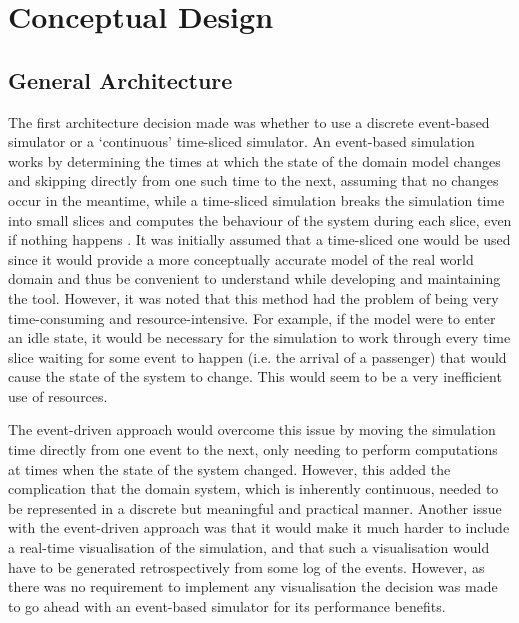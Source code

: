 \documentclass{UoYCSproject}
\begin{document}
\section{Conceptual Design}

\subsection{General Architecture}

The first architecture decision made was whether to use a discrete event-based simulator or a `continuous' time-sliced simulator.  An event-based simulation works by determining the times at which the state of the domain model changes and skipping directly from one such time to the next, assuming that no changes occur in the meantime, while a time-sliced simulation breaks the simulation time into small slices and computes the behaviour of the system during each slice, even if nothing happens \citep{Matloff2008}.  It was initially assumed that a time-sliced one would be used since it would provide a more conceptually accurate model of the real world domain and thus be convenient to understand while developing and maintaining the tool.  However, it was noted that this method had the problem of being very time-consuming and resource-intensive.  For example, if the model were to enter an idle state, it would be necessary for the simulation to work through every time slice waiting for some event to happen (i.e. the arrival of a passenger) that would cause the state of the system to change.  This would seem to be a very inefficient use of resources.

The event-driven approach would overcome this issue by moving the simulation time directly from one event to the next, only needing to perform computations at times when the state of the system changed.  However, this added the complication that the domain system, which is inherently continuous, needed to be represented in a discrete but meaningful and practical manner.  Another issue with the event-driven approach was that it would make it much harder to include a real-time visualisation of the simulation, and that such a visualisation would have to be generated retrospectively from some log of the events.  However, as there was no requirement to implement any visualisation the decision was made to go ahead with an event-based simulator for its performance benefits.
\end{document}
